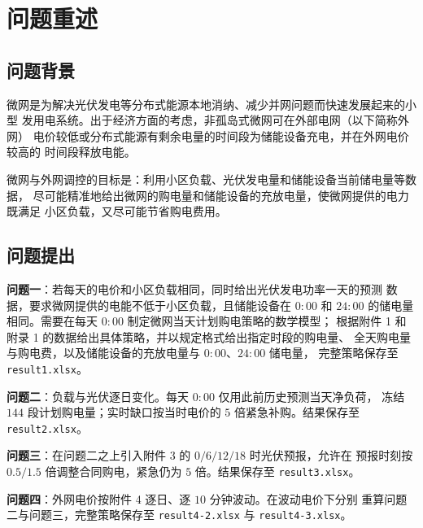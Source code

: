 \documentclass[withoutpreface,bwprint]{cumcmthesis}
\begin{document}
\begin{abstract}
引入附件 4 后，$0{:}00$ 计划只用历史电价做因果预测，结算用当天实际价。
问题二重算 \textbf{1478.08} 万元，问题三 \textbf{1412.65} 万元。

\end{abstract}

\section{问题重述}

\subsection{问题背景}

微网是为解决光伏发电等分布式能源本地消纳、减少并网问题而快速发展起来的小型
发用电系统。出于经济方面的考虑，非孤岛式微网可在外部电网（以下简称外网）
电价较低或分布式能源有剩余电量的时间段为储能设备充电，并在外网电价较高的
时间段释放电能。

微网与外网调控的目标是：利用小区负载、光伏发电量和储能设备当前储电量等数据，
尽可能精准地给出微网的购电量和储能设备的充放电量，使微网提供的电力既满足
小区负载，又尽可能节省购电费用。

\subsection{问题提出}

\textbf{问题一}：若每天的电价和小区负载相同，同时给出光伏发电功率一天的预测
数据，要求微网提供的电能不低于小区负载，且储能设备在 $0{:}00$ 和 $24{:}00$
的储电量相同。需要在每天 $0{:}00$ 制定微网当天计划购电策略的数学模型；
根据附件 1 和附录 1 的数据给出具体策略，并以规定格式给出指定时段的购电量、
全天购电量与购电费，以及储能设备的充放电量与 $0{:}00$、$24{:}00$ 储电量，
完整策略保存至 \texttt{result1.xlsx}。

\textbf{问题二}：负载与光伏逐日变化。每天 $0{:}00$ 仅用此前历史预测当天净负荷，
冻结 $144$ 段计划购电量；实时缺口按当时电价的 $5$ 倍紧急补购。结果保存至
\texttt{result2.xlsx}。

\textbf{问题三}：在问题二之上引入附件 3 的 $0/6/12/18$ 时光伏预报，允许在
预报时刻按 $0.5/1.5$ 倍调整合同购电，紧急仍为 $5$ 倍。结果保存至
\texttt{result3.xlsx}。

\textbf{问题四}：外网电价按附件 4 逐日、逐 $10$ 分钟波动。在波动电价下分别
重算问题二与问题三，完整策略保存至 \texttt{result4-2.xlsx} 与
\texttt{result4-3.xlsx}。
\end{document}

